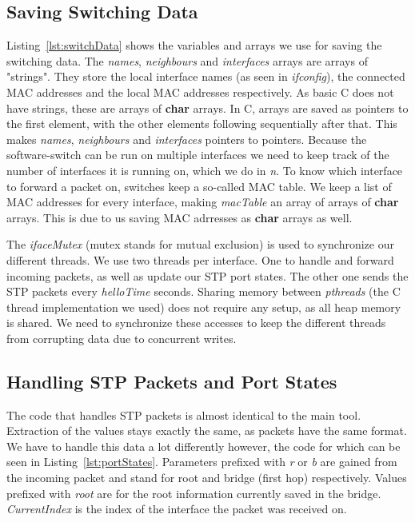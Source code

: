 \subsection{Saving Switching Data}

Listing~\ref{lst:switchData} shows the variables and arrays we use for saving the switching data.
The \textit{names}, \textit{neighbours} and \textit{interfaces} arrays are arrays of "strings".
They store the local interface names (as seen in \textit{ifconfig}), the connected MAC addresses and the local MAC addresses respectively.
As basic C does not have strings, these are arrays of \textbf{char} arrays.
In C, arrays are saved as pointers to the first element, with the other elements following sequentially after that.
This makes \textit{names}, \textit{neighbours} and \textit{interfaces} pointers to pointers.
Because the software-switch can be run on multiple interfaces we need to keep track of the number of interfaces it is running on, which we do in \textit{n}.
To know which interface to forward a packet on, switches keep a so-called MAC table.
We keep a list of MAC addresses for every interface, making \textit{macTable} an array of arrays of \textbf{char} arrays.
This is due to us saving MAC adrresses as \textbf{char} arrays as well.

The \textit{ifaceMutex} (mutex stands for mutual exclusion) is used to synchronize our different threads.
We use two threads per interface.
One to handle and forward incoming packets, as well as update our STP port states.
The other one sends the STP packets every \textit{helloTime} seconds.
Sharing memory between \textit{pthreads} (the C thread implementation we used) does not require any setup, as all heap memory is shared\cite{pthreads}.
We need to synchronize these accesses to keep the different threads from corrupting data due to concurrent writes.

\subsection{Handling STP Packets and Port States}
The code that handles STP packets is almost identical to the main tool.
Extraction of the values stays exactly the same, as packets have the same format.
We have to handle this data a lot differently however, the code for which can be seen in Listing~\ref{lst:portStates}.
Parameters prefixed with \textit{r} or \textit{b} are gained from the incoming packet and stand for root and bridge (first hop) respectively.
Values prefixed with \textit{root} are for the root information currently saved in the bridge.
\textit{CurrentIndex} is the index of the interface the packet was received on.


